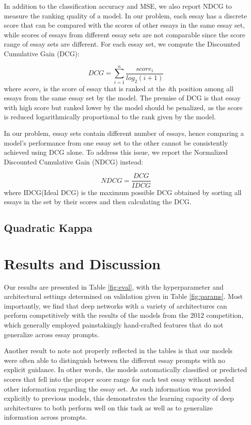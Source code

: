 \documentclass[10pt,psamsfonts]{amsart}
\theoremstyle{definition}
\theoremstyle{remark}
\numberwithin{equation}{section}
\begin{document}
In addition to the classification accuracy and MSE, we also report NDCG to measure the ranking quality of a model. In our problem, each essay has a discrete score that can be compared with the scores of other essays in the same essay set, while scores of essays from different essay sets are not comparable since the score range of essay sets are different. For each essay set, we compute the Discounted Cumulative Gain (DCG):
 
$$DCG=\sum_{i=1}^n\frac{score_i}{log_2(i+1)}$$
where $score_i$ is the score of essay that is ranked at the \textit{i}th position among all essays from the same essay set by the model. The premise of DCG is that essay with high score but ranked lower by the model should be penalized, as the score is reduced logarithmically proportional to the rank given by the model.

In our problem, essay sets contain different number of essays, hence comparing a model's performance from one essay set to the other cannot be consistently achieved using DCG alone. To address this issue, we report the Normalized Discounted Cumulative Gain (NDCG) instead:

$$NDCG=\frac{DCG}{IDCG}$$
where IDCG(Ideal DCG) is the maximum possible DCG obtained by sorting all essays in the set by their scores and then calculating the DCG.

\subsection*{Quadratic Kappa}



\section*{Results and Discussion}

Our results are presented in Table \ref{fig:eval}, with the hyperparameter and architectural settings determined on validation given in Table \ref{fig:params}. Most importantly, we find that deep networks with a variety of architectures can perform competitively with the results of the models from the 2012 competition, which generally employed painstakingly hand-crafted features that do not generalize across essay prompts.

Another result to note not properly reflected in the tables is that our models were often able to distinguish between the different essay prompts with no explicit guidance. In other words, the models automatically classified or predicted scores that fell into the proper score range for each test essay without needed other information regarding the essay set. As such information was provided explicitly to previous models, this demonstrates the learning capacity of deep architectures to both perform well on this task as well as to generalize information across prompts.
\end{document}
